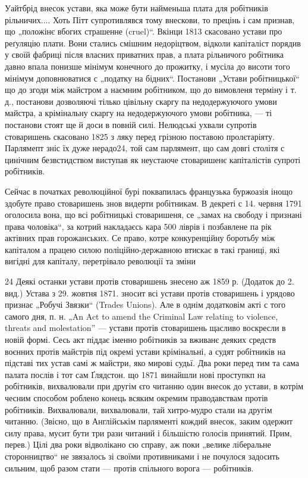 Уайтбрід внесок устави, яка може бути найменьша плата
для робітників рільничих.... Хоть Пітт супротивлявся тому
внескови, то прецінь і сам признав, що „положінє вбогих
страшенне (cruel)“. Вкінци 1813 скасовано устави про реґуляцію
плати. Вони стались смішним недоріцтвом, відколи
капіталіст порядив у своїй фабриці після власних приватних
прав, а плата рільничого робітника давно впала понизше
мінімум конечного до прожитку, і мусіла до висоти
того мінімум доповнюватися с „податку на бідних“. Постанови
„Устави робітницької“ що до згоди між майстром
а наємним робітником, що до вимовленя терміну і т. д.,
постанови дозволяючі тілько цівільну скаргу па недодержуючого
умови майстра, а крімінальну скаргу на недодержуючого
умови робітника, — ті постанови стоят ще й доси
в повній силі. Нелюдські ухвали супротів стоваришень
скасовано 1825 з ляку перед грізною поставою пролєтаріяту.
Парлямепт зніс їх дуже нерадо24,  той сам парлямент, що
сам довгі столітя с цинічним безвстидством виступав як
неустаюче стоваришенє капіталістів супроті робітників.

Сейчас в початках революційної бурі поквапилась французька
буржоазія інощо здобуте право стоваришень знов
видерти робітникам. В декреті с 14. червня 1791 оголосила
вона, що всі робітницькі стоваришеня, се „замах на свободу
і признані права чоловіка“, за котрий накладаєсь кара
500 ліврів і позбавлене па рік актівних прав горожанських.
Се право, котре конкуренційну боротьбу між капіталом
а працею силою поліційно-державною втискає в такі границі,
які вигідні для капіталу, перетрівало революції та зміни

24 Деякі останки устави протів стоваришень знесено аж 1859 р.
(Додаток до 2. вид.) Устава з 29. жовтня 1871. зносит всі устави
протів стоваришень і урядово признає „Робучі Звязки“ (Trades Unions).
Але в однім додатковім акті с того самого дня, п. н. „An Act to amend
the Criminal Law relating to violence, threats and molestation” — устави
протів стоваришень щасливо воскресли в новій формі. Сесь акт піддає
іменно робітників за вживанє деяких средств воєнних протів майстрів
під окремі устави крімінальні, а судят робітників на підставі тих устав
самі ж майстри, яко мирові судьї. Два роки перед тим та сама палата
послів і тот сам Ґлядстон. що 1871 винайшли нові проступкп на робітників,
вихвалювали при другім єго читанню один внесок до устави, в котрім
чесним способом роблено конець всяким окремим праводавствам
протів робітників. Вихвалювали, вихвалювали, тай хитро-мудро стали на
другім читанню. (Звісно, що в Англійськім парляменті кождий внесок,
заким одержит силу права, мусит бути три рази читаний і більшістю голосів
принятий. Прим, перев.) Цілі два роки відволікано сю справу, аж
поки „велике ліберальне сторонництво“ не звязалось зі своїми противниками
і не почулося задосить сильним, щоб разом стати — протів спільного
ворога — робітників.
